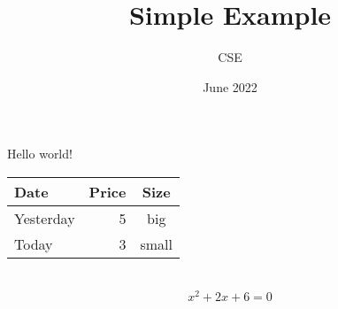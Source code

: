 \documentclass{article}
\title{Simple Example}
\author{CSE}
\date{June 2022}
\begin{document}
\maketitle
Hello world!
\\


\begin{tabular}{|l|r|c|} \hline
Date & Price & Size \\ \hline
Yesterday & 5 & big \\ \hline
Today & 3 & small \\ \hline
\end{tabular}
\\


  
\begin{equation}  
x^2 +2x+ 6 = 0               
\end{equation}  
\end{document}
